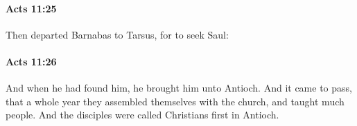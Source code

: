 		\paragraph{Acts 11:25} %
			\label{ACTS-11-25}

			Then departed Barnabas to Tarsus, for to seek Saul:

			\begin{framed}
			\scriptsize
				\begin{compactdesc}
					\item[SBLG] 
				\end{compactdesc}
			\end{framed}

		\paragraph{Acts 11:26} %
			\label{ACTS-11-26}

			And when he had found him, he brought him unto Antioch.  And it came to pass, that a whole year they assembled themselves with the church, and taught much people.  And the disciples were called Christians first in Antioch.

